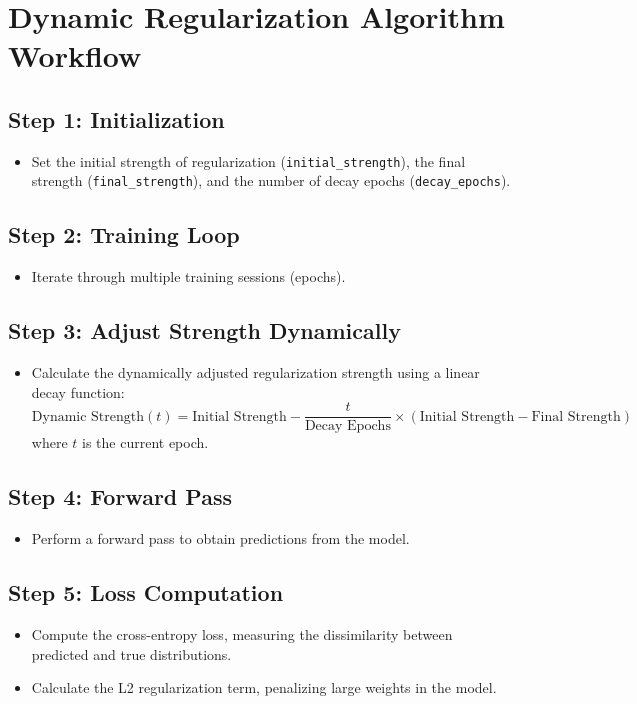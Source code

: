 \documentclass{article}
\begin{document}
\section*{Dynamic Regularization Algorithm Workflow}

\subsection*{Step 1: Initialization}
\begin{itemize}
    \item Set the initial strength of regularization (\texttt{initial\_strength}), the final strength (\texttt{final\_strength}), and the number of decay epochs (\texttt{decay\_epochs}).
\end{itemize}

\subsection*{Step 2: Training Loop}
\begin{itemize}
    \item Iterate through multiple training sessions (epochs).
\end{itemize}

\subsection*{Step 3: Adjust Strength Dynamically}
\begin{itemize}
    \item Calculate the dynamically adjusted regularization strength using a linear decay function:
    \[ \text{Dynamic Strength}(t) = \text{Initial Strength} - \frac{t}{\text{Decay Epochs}} \times (\text{Initial Strength} - \text{Final Strength}) \]
    where \( t \) is the current epoch.
\end{itemize}

\subsection*{Step 4: Forward Pass}
\begin{itemize}
    \item Perform a forward pass to obtain predictions from the model.
\end{itemize}

\subsection*{Step 5: Loss Computation}
\begin{itemize}
    \item Compute the cross-entropy loss, measuring the dissimilarity between predicted and true distributions.
    \item Calculate the L2 regularization term, penalizing large weights in the model.
\end{itemize}
\end{document}
